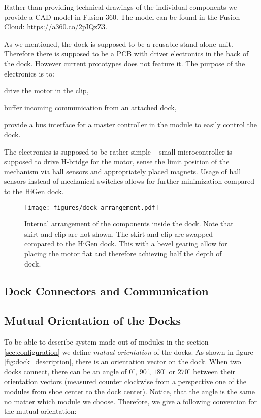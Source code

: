 Rather than providing technical drawings of the individual components we provide
a CAD model in Fusion 360. The model can be found in the Fusion Cloud:
\url{https://a360.co/2pIQzZ3}.

As we mentioned, the dock is supposed to be a reusable stand-alone unit.
Therefore there is supposed to be a PCB with driver electronics in the back of
the dock. However current prototypes does not feature it. The purpose of the
electronics is to:
\begin{enumerate*}
    \item drive the motor in the clip,
    \item buffer incoming communication from an attached dock,
    \item provide a bus interface for a master controller in the module to
    easily control the dock.
\end{enumerate*}
The electronics is supposed to be rather simple -- small microcontroller is
supposed to drive H-bridge for the motor, sense the limit position of the
mechanism via hall sensors and appropriately placed magnets. Usage of hall
sensors instead of mechanical switches allows for further minimization compared
to the HiGen dock.

\begin{figure}[h!]
    \centering
    \texttt{[image: figures/dock\_arrangement.pdf]}
    \caption{Internal arrangement of the components inside the dock. Note that
    skirt and clip are not shown. The skirt and clip are swapped compared to the
    HiGen dock. This with a bevel gearing allow for placing the motor flat and
    therefore achieving half the depth of dock.}
    \label{fig:dock_internal_arrangement}
\end{figure}

\subsection{Dock Connectors and Communication}


\subsection{Mutual Orientation of the Docks}\label{sec:mutual_orientation}

To be able to describe system made out of modules in the section
\ref{sec:configuration} we define \emph{mutual orientation} of the docks. As
shown in figure \ref{fig:dock_description}, there is an orientation vector on
the dock. When two docks connect, there can be an angle of $0^\circ$,
$90^\circ$, $180^\circ$ or $270^\circ$ between their orientation vectors
(measured counter clockwise from a perspective one of the modules from shoe
center to the dock center). Notice, that the angle is the same no matter which
module we choose. Therefore, we give a following convention for the mutual
orientation:

